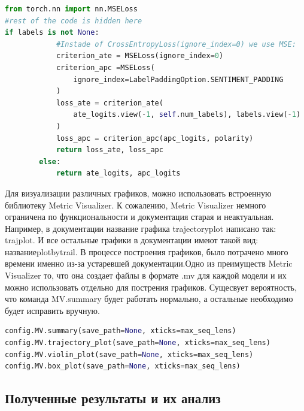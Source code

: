 \begin{lstlisting}[label=listing5, caption=Функция потери, language = Python]
from torch.nn import nn.MSELoss
#rest of the code is hidden here
if labels is not None:
            #Instade of CrossEntropyLoss(ignore_index=0) we use MSE:
            criterion_ate = MSELoss(ignore_index=0)
            criterion_apc =MSELoss(
                ignore_index=LabelPaddingOption.SENTIMENT_PADDING
            )
            loss_ate = criterion_ate(
                ate_logits.view(-1, self.num_labels), labels.view(-1)
            )
            loss_apc = criterion_apc(apc_logits, polarity)
            return loss_ate, loss_apc
        else:
            return ate_logits, apc_logits

\end{lstlisting}

Для визуализации различных графиков, можно использовать встроенную библиотеку Metric Visualizer. К сожалению, Metric Visualizer немного ограничена по функциональности и документация старая и неактуальная. Например, в документации название графика \flqq trajectory\textunderscore plot\frqq \vspace{1pt} написано так: \flqq traj\textunderscore plot\frqq. И все остальные графики в документации имеют такой вид:  \flqq название\textunderscore plot\textunderscore by\textunderscore trail\frqq. В процессе построения графиков, было потрачено много времени именно из-за устаревшей документации.Одно из преимуществ Metric Visualizer то, что она создает файлы в формате .mv для каждой модели и их можно использовать отдельно для пострения графиков. Сущесвует вероятность, что команда MV.summary будет работать нормально, а остальные необходимо будет исправить вручную.

\begin{lstlisting}[label=listing7, caption=Metric Visualizer, language = Python]
config.MV.summary(save_path=None, xticks=max_seq_lens)
config.MV.trajectory_plot(save_path=None, xticks=max_seq_lens)
config.MV.violin_plot(save_path=None, xticks=max_seq_lens)
config.MV.box_plot(save_path=None, xticks=max_seq_lens)
\end{lstlisting}


\subsection{Полученные результаты и их анализ}

